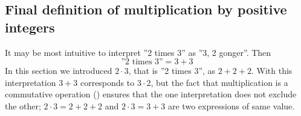 \subsection*{Final definition of multiplication by positive integers}
It may be most intuitive to interpret ''2 times 3'' as ''3, 2 gonger''. Then
\[ \text{''2 times 3''}=3+3 \]
In this section we introduced $ {2\cdot3} $, that is ''2 times 3'', as $ {2+2+2} $. With this interpretation $ {3+3} $ corresponds to $ {3\cdot2} $, but the fact that multiplication is a commutative operation () ensures that the one interpretation does not exclude the other; $ {2\cdot3 =2+2+2} $ and $ {2\cdot3=3+3} $ are two expressions of same value.\regv




